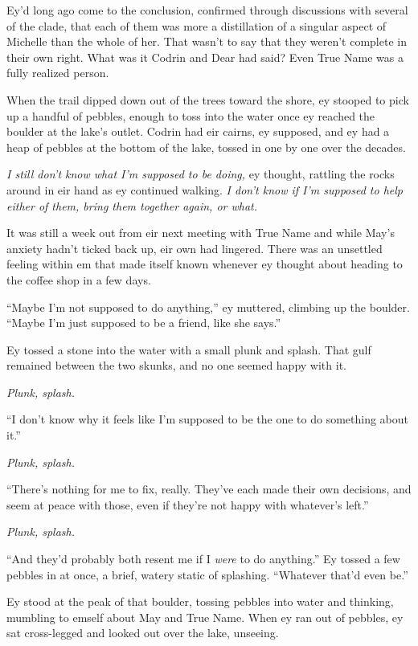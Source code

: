 Ey'd long ago come to the conclusion, confirmed through discussions with several of the clade, that each of them was more a distillation of a singular aspect of Michelle than the whole of her. That wasn't to say that they weren't complete in their own right. What was it Codrin and Dear had said? Even True Name was a fully realized person.

When the trail dipped down out of the trees toward the shore, ey stooped to pick up a handful of pebbles, enough to toss into the water once ey reached the boulder at the lake's outlet. Codrin had eir cairns, ey supposed, and ey had a heap of pebbles at the bottom of the lake, tossed in one by one over the decades.

\emph{I still don't know what I'm supposed to be doing,} ey thought, rattling the rocks around in eir hand as ey continued walking. \emph{I don't know if I'm supposed to help either of them, bring them together again, or what.}

It was still a week out from eir next meeting with True Name and while May's anxiety hadn't ticked back up, eir own had lingered. There was an unsettled feeling within em that made itself known whenever ey thought about heading to the coffee shop in a few days.

``Maybe I'm not supposed to do anything,'' ey muttered, climbing up the boulder. ``Maybe I'm just supposed to be a friend, like she says.''

Ey tossed a stone into the water with a small plunk and splash. That gulf remained between the two skunks, and no one seemed happy with it.

\emph{Plunk, splash.}

``I don't know why it feels like I'm supposed to be the one to do something about it.''

\emph{Plunk, splash.}

``There's nothing for me to fix, really. They've each made their own decisions, and seem at peace with those, even if they're not happy with whatever's left.''

\emph{Plunk, splash.}

``And they'd probably both resent me if I \emph{were} to do anything.'' Ey tossed a few pebbles in at once, a brief, watery static of splashing. ``Whatever that'd even be.''

Ey stood at the peak of that boulder, tossing pebbles into water and thinking, mumbling to emself about May and True Name. When ey ran out of pebbles, ey sat cross-legged and looked out over the lake, unseeing.

